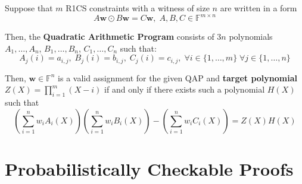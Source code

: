 \documentclass{zkdl-presentation-template}
\begin{document}
    \begin{frame}
        \begin{definition}
            Suppose that $m$ R1CS constraints with a witness of size $n$ are written in a form
            \begin{equation*}
                A\mathbf{w} \odot B\mathbf{w} = C\mathbf{w}, \; A,B,C \in \mathbb{F}^{m \times n}
            \end{equation*}
        
            Then, the \textbf{Quadratic Arithmetic Program} consists of $3n$ polynomials $A_1,\dots,A_n$, $B_1,\dots,B_n$, $C_1,\dots,C_n$ such that:
            \begin{equation*}
                A_j(i) = a_{i,j}, \; B_j(i) = b_{i,j}, \; C_j(i) = c_{i,j}, \; \forall i \in \{1,\dots,m\} \; \forall j \in \{1,\dots,n\}
            \end{equation*}
        
            Then, $\mathbf{w} \in \mathbb{F}^n$ is a valid assignment for the given QAP and \textbf{target polynomial} $Z(X) = \prod_{i=1}^m (X-i)$ if and only if there exists such a polynomial $H(X)$ such that
            \begin{equation*}
                \left( \sum_{i = 1}^{n} w_iA_i(X) \right)\left( \sum_{i = 1}^{n} w_iB_i(X) \right) - \left( \sum_{i = 1}^{n} w_iC_i(X) \right) = Z(X)H(X)
            \end{equation*}
        \end{definition}
    \end{frame}

    \section{Probabilistically Checkable Proofs}
\end{document}

